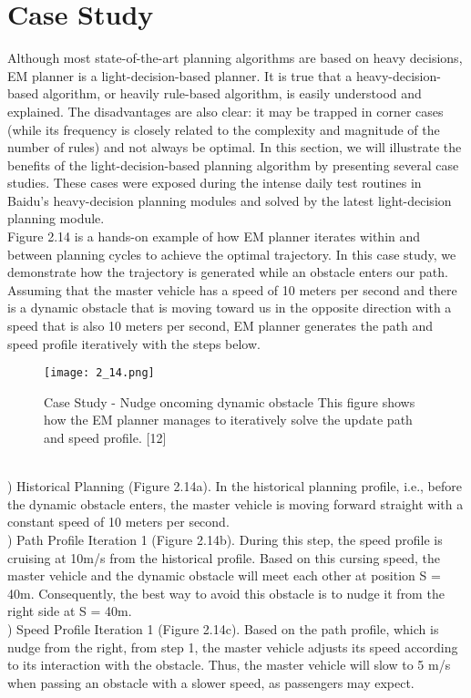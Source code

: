 \documentclass{report}
\begin{document}
\section{Case Study}
Although most state-of-the-art planning algorithms are based on heavy decisions, EM planner is a light-decision-based planner. It is true that a heavy-decision-based algorithm, or heavily rule-based algorithm, is easily understood and explained. The disadvantages are also clear: it may be trapped in corner cases (while its frequency is closely related to the complexity and magnitude of the number of rules) and not always be optimal. In this section, we will illustrate the benefits of the light-decision-based planning algorithm by presenting several case studies. These cases were exposed during the intense daily test routines in Baidu’s heavy-decision planning modules and solved by the latest light-decision planning module.\\
\indent
Figure 2.14 is a hands-on example of how EM
planner iterates within and between planning cycles to achieve the optimal trajectory. In this case study, we demonstrate how the trajectory is generated while an obstacle enters our path. Assuming that the master vehicle has a speed of 10 meters per second and there is a dynamic obstacle that is moving toward us in the opposite direction with a speed that is also 10 meters per second, EM planner generates the path and speed profile iteratively with the steps below.
\begin{figure}[ht]
	\centering
	\texttt{[image: 2\_14.png]}
	\caption{Case Study - Nudge oncoming dynamic obstacle This figure shows how the EM planner manages to iteratively solve the update path and speed profile. [12]}
	\label{fig:2.14} 
\end{figure}\\
) Historical Planning (Figure 2.14a). In the historical planning profile, i.e., before the dynamic obstacle enters, the master vehicle
is moving forward straight with a constant
speed of 10 meters per second.\\
) Path Profile Iteration 1 (Figure 2.14b). During this step, the speed profile is cruising at 10m/s from the historical profile. Based on this cursing speed, the master vehicle and the dynamic obstacle will meet each other at
position S = 40m. Consequently, the best
way to avoid this obstacle is to nudge it from the right side at S = 40m.\\
) Speed Profile Iteration 1 (Figure 2.14c). Based on the path profile, which is nudge from the right, from step 1, the master vehicle adjusts its speed according to its interaction with the obstacle. Thus, the master vehicle will slow to 5 m/s when passing an obstacle with a slower speed, as passengers may expect.\\
\end{document}
